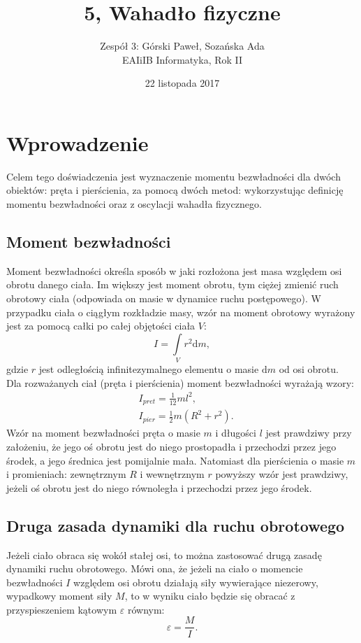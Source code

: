 \documentclass[12pt,a4paper]{article}
\title{5, Wahadło fizyczne}
\date{22 listopada 2017}
\author{
	Zespół 3: Górski Paweł, Sozańska Ada\\
	EAIiIB Informatyka, Rok II
}
\numberwithin{equation}{section}
\begin{document}
\maketitle
\section{Wprowadzenie}
Celem tego doświadczenia jest wyznaczenie momentu bezwładności dla dwóch obiektów: pręta i pierścienia, za pomocą dwóch metod: wykorzystując definicję momentu bezwładności oraz z oscylacji wahadła fizycznego.

\subsection{Moment bezwładności}

Moment bezwładności określa sposób w jaki rozłożona jest masa względem osi obrotu danego ciała. Im większy jest moment obrotu, tym ciężej zmienić ruch obrotowy ciała (odpowiada on masie w dynamice ruchu postępowego). W przypadku ciała o ciągłym rozkładzie masy, wzór na moment obrotowy wyrażony jest za pomocą całki po całej objętości ciała $V$:
\begin{equation}
	I = \int\limits_{V} r^2\textrm{d}m,
\end{equation}
gdzie $r$ jest odległością infinitezymalnego elementu o masie $\textrm{d}m$ od osi obrotu.\\

Dla rozważanych ciał (pręta i pierścienia) moment bezwładności wyrażają wzory:
\begin{align}
	&I_{pret} = \frac{1}{12}ml^2, \label{eq:pret}\\
	&I_{pier} = \frac{1}{2}m(R^2 + r^2). \label{eq:piers}
\end{align}
Wzór na moment bezwładności pręta o masie $m$ i długości $l$ jest prawdziwy przy założeniu, że jego oś obrotu jest do niego prostopadła i przechodzi przez jego środek, a jego średnica jest pomijalnie mała.
Natomiast dla pierścienia o masie $m$ i promieniach: zewnętrznym $R$ i wewnętrznym $r$ powyższy wzór jest prawdziwy, jeżeli oś obrotu jest do niego równoległa i przechodzi przez jego środek. 

\subsection{Druga zasada dynamiki dla ruchu obrotowego}

Jeżeli ciało obraca się wokół stałej osi, to można zastosować drugą zasadę dynamiki ruchu obrotowego. Mówi ona, że jeżeli na ciało o momencie bezwładności $I$ względem osi obrotu działają siły wywierające niezerowy, wypadkowy moment siły $M$, to w wyniku ciało będzie się obracać z przyspieszeniem kątowym $\varepsilon$ równym:
\begin{equation}
	\varepsilon = \frac{M}{I}.
	\label{eq:zasada}
\end{equation}
\end{document}
